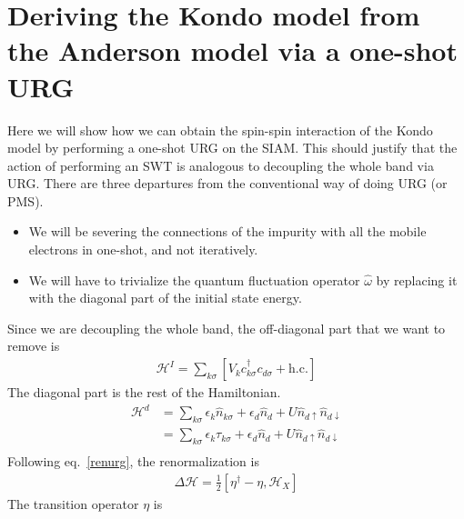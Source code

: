 \section{Deriving the Kondo model from the Anderson model via a one-shot URG}\label{SWT from URG}
Here we will show how we can obtain the spin-spin interaction of the Kondo model by performing a one-shot URG on the SIAM. This should justify that the action of performing an SWT is analogous to decoupling the whole band via URG. 
There are three departures from the conventional way of doing URG (or PMS).
\begin{itemize}
    \item We will be severing the connections of the impurity with all the mobile electrons in one-shot, and not iteratively.
    \item We will have to trivialize the quantum fluctuation operator \(\hat \omega\) by replacing it with the diagonal part of the initial state energy.
\end{itemize}
Since we are decoupling the whole band, the off-diagonal part that we want to remove is
\begin{equation}\begin{aligned}
	\mathcal{H}^I = \sum_{k\sigma}\left[V_k c^\dagger_{k\sigma}c_{d\sigma}+\text{h.c.}\right]
\end{aligned}\end{equation}
The diagonal part is the rest of the Hamiltonian.
\begin{equation}\begin{aligned}
\mathcal{H}^d &= \sum_{k\sigma}\epsilon_k\hat n_{k\sigma} + \epsilon_d\hat n_d + U\hat n_{d\uparrow}\hat n_{d\downarrow}\\
&= \sum_{k\sigma}\epsilon_k\tau_{k\sigma} + \epsilon_d\hat n_d + U\hat n_{d\uparrow}\hat n_{d\downarrow}\\
\end{aligned}\end{equation}
Following eq.~\ref{renurg}, the renormalization is
\begin{equation}\begin{aligned}
	\Delta \mathcal{H} = \frac{1}{2}\left[\eta^\dagger - \eta, \mathcal{H}_X\right]
\end{aligned}\end{equation}
The transition operator \(\eta\) is
